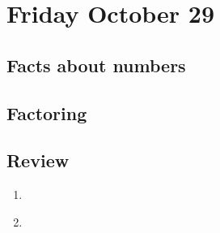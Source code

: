 \newpage
\section*{Friday October 29}
\subsection*{Facts about numbers}

\subsection*{Factoring}



\newpage



\newpage
\subsection*{Review}
\begin{enumerate}
    \item \hspace{1in}\\ 
    \item \hspace{1in}\\ 
\end{enumerate}



